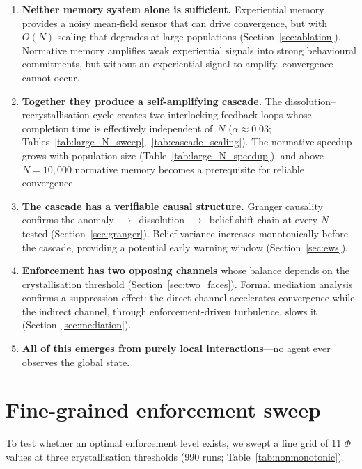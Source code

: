 \documentclass[11pt,a4paper]{article}
\begin{document}
\begin{enumerate}[nosep]
\item \textbf{Neither memory system alone is sufficient.} Experiential memory provides a noisy mean-field sensor that can drive convergence, but with $O(N)$ scaling that degrades at large populations (Section~\ref{sec:ablation}). Normative memory amplifies weak experiential signals into strong behavioural commitments, but without an experiential signal to amplify, convergence cannot occur.

\item \textbf{Together they produce a self-amplifying cascade.} The dissolution--recrystallisation cycle creates two interlocking feedback loops whose completion time is effectively independent of~$N$ ($\alpha \approx 0.03$; Tables~\ref{tab:large_N_sweep},~\ref{tab:cascade_scaling}). The normative speedup grows with population size (Table~\ref{tab:large_N_speedup}), and above $N{=}10{,}000$ normative memory becomes a prerequisite for reliable convergence.

\item \textbf{The cascade has a verifiable causal structure.} Granger causality confirms the anomaly~$\to$~dissolution~$\to$~belief-shift chain at every $N$ tested (Section~\ref{sec:granger}). Belief variance increases monotonically before the cascade, providing a potential early warning window (Section~\ref{sec:ews}).

\item \textbf{Enforcement has two opposing channels} whose balance depends on the crystallisation threshold (Section~\ref{sec:two_faces}). Formal mediation analysis confirms a suppression effect: the direct channel accelerates convergence while the indirect channel, through enforcement-driven turbulence, slows it (Section~\ref{sec:mediation}).

\item \textbf{All of this emerges from purely local interactions}---no agent ever observes the global state.
\end{enumerate}

\appendix
\section{Fine-grained enforcement sweep}
\label{app:nonmonotonic}

To test whether an optimal enforcement level exists, we swept a fine grid of 11 $\Phi$ values at three crystallisation thresholds (990 runs; Table~\ref{tab:nonmonotonic}).
\end{document}
